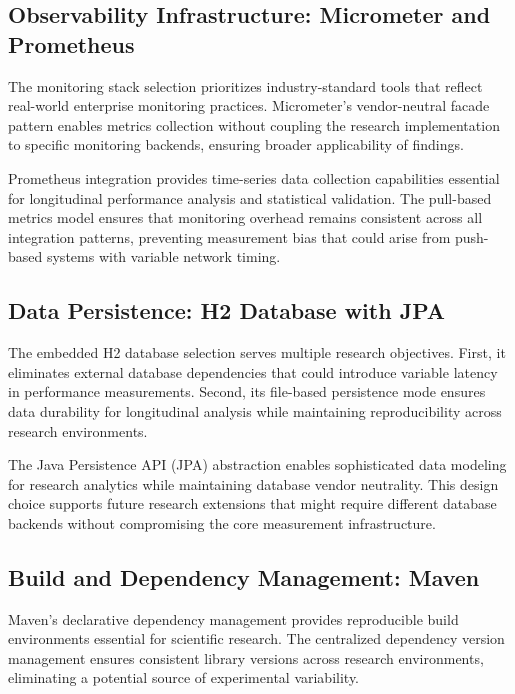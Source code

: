 \subsection{Observability Infrastructure: Micrometer and Prometheus}

The monitoring stack selection prioritizes industry-standard tools that reflect real-world enterprise monitoring practices. Micrometer's vendor-neutral facade pattern enables metrics collection without coupling the research implementation to specific monitoring backends, ensuring broader applicability of findings.

Prometheus integration provides time-series data collection capabilities essential for longitudinal performance analysis and statistical validation. The pull-based metrics model ensures that monitoring overhead remains consistent across all integration patterns, preventing measurement bias that could arise from push-based systems with variable network timing.

\subsection{Data Persistence: H2 Database with JPA}

The embedded H2 database selection serves multiple research objectives. First, it eliminates external database dependencies that could introduce variable latency in performance measurements. Second, its file-based persistence mode ensures data durability for longitudinal analysis while maintaining reproducibility across research environments.

The Java Persistence API (JPA) abstraction enables sophisticated data modeling for research analytics while maintaining database vendor neutrality. This design choice supports future research extensions that might require different database backends without compromising the core measurement infrastructure.

\subsection{Build and Dependency Management: Maven}

Maven's declarative dependency management provides reproducible build environments essential for scientific research. The centralized dependency version management ensures consistent library versions across research environments, eliminating a potential source of experimental variability.

